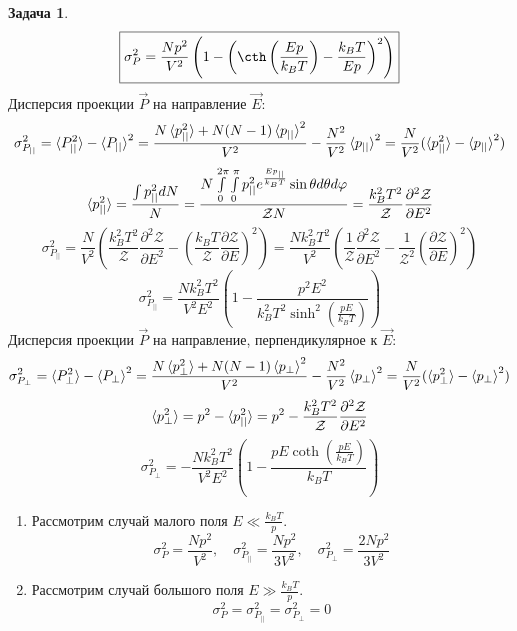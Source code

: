 \documentclass[12pt]{article}
\theoremstyle{definition}
\newtheorem{zad}{Задача}[section]
\begin{document}
\begin{zad}
\begin{equation}
    \boxed{\sigma_P^2=\frac{Np^2}{V^2}\left(1-\left(\cth\left(\frac{Ep}{k_BT}\right)-\frac{k_BT}{Ep}\right)^2\right)}
\end{equation}
Дисперсия проекции $\vec{P}$ на направление $\vec{E}$:
\begin{equation}
    \sigma_{P_{||}}^2=\braket{P_{||}^2}-\braket{P_{||}}^2=\frac{N\braket{p_{||}^2}+N(N-1)\braket{p_{||}}^2}{V^2}-\frac{N^2}{V^2}\braket{p_{||}}^2=\frac{N}{V^2}(\braket{p_{||}^2}-\braket{p_{||}}^2)
\end{equation}
\begin{equation}
    \braket{p_{||}^2}=\frac{\int p^2_{||}dN}{N}=\frac{N\int\limits_0^{2\pi}\int\limits_0^\pi p^2_{||}e^{\frac{Ep_{||}}{k_BT}}\sin\theta d\theta d\varphi}{\mathcal{Z}N}=\frac{k^2_BT^2}{\mathcal{Z}}\frac{\partial^2\mathcal{Z}}{\partial E^2}
\end{equation}
\begin{equation}
    \sigma_{P_{||}}^2=\frac{N}{V^2}\left(\frac{k^2_BT^2}{\mathcal{Z}}\frac{\partial^2\mathcal{Z}}{\partial E^2}-\left(\frac{k_BT}{\mathcal{Z}}\frac{\partial\mathcal{Z}}{\partial E}\right)^2\right)=\frac{Nk^2_BT^2}{V^2}\left(\frac{1}{\mathcal{Z}}\frac{\partial^2\mathcal{Z}}{\partial E^2}-\frac{1}{\mathcal{Z}^2}\left(\frac{\partial\mathcal{Z}}{\partial E}\right)^2\right)
\end{equation}
\begin{equation}
    \boxed{\sigma_{P_{||}}^2=\frac{Nk^2_BT^2}{V^2E^2}\left(1-\frac{p^2E^2}{k^2_BT^2\sinh^2\left(\frac{pE}{k_BT}\right)}\right)}
\end{equation}
Дисперсия проекции $\vec{P}$ на направление, перпендикулярное к $\vec{E}$:
\begin{equation}
    \sigma_{P_\perp}^2=\braket{P_\perp^2}-\braket{P_\perp}^2=\frac{N\braket{p_\perp^2}+N(N-1)\braket{p_\perp}^2}{V^2}-\frac{N^2}{V^2}\braket{p_\perp}^2=\frac{N}{V^2}(\braket{p_\perp^2}-\braket{p_\perp}^2)
\end{equation}
\begin{equation}
    \braket{p_\perp^2}=p^2-\braket{p_{||}^2}=p^2-\frac{k^2_BT^2}{\mathcal{Z}}\frac{\partial^2\mathcal{Z}}{\partial E^2}
\end{equation}
\begin{equation}
    \boxed{\sigma_{P_\perp}^2=-\frac{Nk^2_BT^2}{V^2E^2}\left(1-\frac{pE\coth\left(\frac{pE}{k_BT}\right)}{k_BT}\right)}
\end{equation}
\begin{enumerate}
\item Рассмотрим случай малого поля $E\ll\frac{k_BT}{p}$.
\begin{equation}
    \boxed{\sigma_P^2=\frac{Np^2}{V^2},\quad\sigma_{P_{||}}^2=\frac{Np^2}{3V^2},\quad\sigma_{P_\perp}^2=\frac{2Np^2}{3V^2}}
\end{equation}
\item Рассмотрим случай большого поля $E\gg\frac{k_BT}{p}$.
\begin{equation}
    \boxed{\sigma_P^2=\sigma^2_{P_{||}}=\sigma^2_{P_\perp}=0}
\end{equation}
\end{enumerate}
\end{zad}
\end{document}
